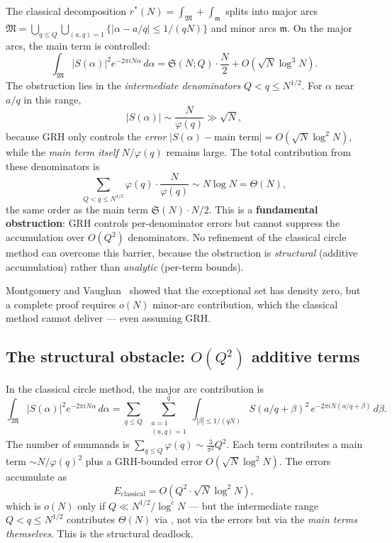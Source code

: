\documentclass[11pt,a4paper]{article}
\theoremstyle{remark}
\begin{document}
The classical decomposition $r^*(N) = \int_\mathfrak{M} + \int_\mathfrak{m}$
splits into major arcs $\mathfrak{M} = \bigcup_{q \leq Q}\bigcup_{(a,q)=1}
\{|\alpha - a/q| \leq 1/(qN)\}$ and minor arcs $\mathfrak{m}$.
On the major arcs, the main term is controlled:
\begin{equation}
\label{eq:main-arc}
  \int_\mathfrak{M} |S(\alpha)|^2 e^{-2\pi i N\alpha}\,d\alpha
  = \mathfrak{S}(N;Q)\cdot\frac{N}{2} + O(\sqrt{N}\log^3 N).
\end{equation}
The obstruction lies in the \emph{intermediate denominators}
$Q < q \leq N^{1/2}$.  For $\alpha$ near $a/q$ in this range,
\begin{equation}
\label{eq:intermediate}
  |S(\alpha)| \sim \frac{N}{\varphi(q)} \gg \sqrt{N},
\end{equation}
because GRH only controls the \emph{error}
$|S(\alpha) - \text{main term}| = O(\sqrt{N}\log^2 N)$, while the
\emph{main term itself} $N/\varphi(q)$ remains large.  The total
contribution from these denominators is
\begin{equation}
\label{eq:intermediate-sum}
  \sum_{Q < q \leq N^{1/2}} \varphi(q)\cdot\frac{N}{\varphi(q)}
  \sim N\log N = \Theta(N),
\end{equation}
the same order as the main term $\mathfrak{S}(N)\cdot N/2$.
This is a \textbf{fundamental obstruction}: GRH controls per-denominator
errors but cannot suppress the accumulation over $O(Q^2)$ denominators.
No refinement of the classical circle method can overcome this barrier,
because the obstruction is \emph{structural} (additive accumulation)
rather than \emph{analytic} (per-term bounds).

Montgomery and Vaughan~\cite{MV1975} showed that the exceptional set
has density zero, but a complete proof requires $o(N)$ minor-arc
contribution, which the classical method cannot deliver --- even
assuming GRH.

\subsection{The structural obstacle: $O(Q^2)$ additive terms}

In the classical circle method, the major arc contribution is
\begin{equation}
\label{eq:classical-decomp}
  \int_\mathfrak{M} |S(\alpha)|^2 e^{-2\pi i N\alpha}\,d\alpha
  = \sum_{q \leq Q}\;\sum_{\substack{a=1\\(a,q)=1}}^{q}
    \int_{|\beta|\leq 1/(qN)} S(a/q+\beta)^2\,e^{-2\pi i N(a/q+\beta)}\,d\beta.
\end{equation}
The number of summands is
$\sum_{q \leq Q}\varphi(q) \sim \frac{3}{\pi^2}Q^2$.
Each term contributes a main term $\sim N/\varphi(q)^2$ plus a
GRH-bounded error $O(\sqrt{N}\log^2 N)$.  The errors accumulate as
\begin{equation}
\label{eq:classical-accumulation}
  E_{\text{classical}} = O\!\left(Q^2 \cdot \sqrt{N}\log^2 N\right),
\end{equation}
which is $o(N)$ only if $Q \ll N^{1/2}/\log^c N$ --- but the intermediate
range $Q < q \leq N^{1/2}$ contributes $\Theta(N)$ via
, not via the errors but via the
\emph{main terms themselves}.  This is the structural deadlock.
\end{document}
